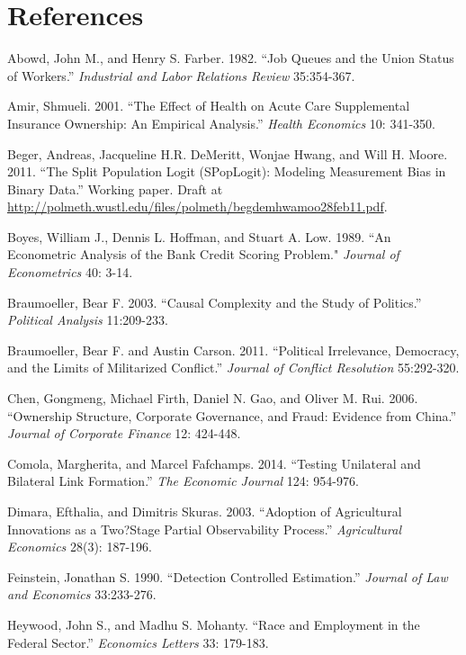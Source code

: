 \documentclass[10pt]{article}
\begin{document}
\singlespace

\section*{References}
\parskip=0.15in
\begin{hangparas}{.25in}{1}

Abowd, John M., and Henry S. Farber. 1982. ``Job Queues and the Union Status of Workers.'' \textit{Industrial and Labor Relations Review} 35:354-367.

Amir, Shmueli. 2001. ``The Effect of Health on Acute Care Supplemental Insurance Ownership: An Empirical Analysis.'' \textit{Health Economics} 10: 341-350.

Beger, Andreas, Jacqueline H.R. DeMeritt, Wonjae Hwang, and Will H. Moore. 2011. ``The Split Population Logit (SPopLogit): Modeling Measurement Bias in Binary Data.'' Working paper. Draft at \href{http://polmeth.wustl.edu/files/polmeth/begdemhwamoo28feb11.pdf}{http://polmeth.wustl.edu/files/polmeth/begdemhwamoo28feb11.pdf}.

Boyes, William J., Dennis L. Hoffman, and Stuart A. Low. 1989. ``An Econometric Analysis of the Bank Credit Scoring Problem." \textit{Journal of Econometrics} 40: 3-14.

Braumoeller, Bear F. 2003. ``Causal Complexity and the Study of Politics.'' \textit{Political Analysis} 11:209-233.

Braumoeller, Bear F. and Austin Carson. 2011. ``Political Irrelevance, Democracy, and the Limits of Militarized Conflict.'' \textit{Journal of Conflict Resolution} 55:292-320.

Chen, Gongmeng, Michael Firth, Daniel N. Gao, and Oliver M. Rui. 2006. ``Ownership Structure, Corporate Governance, and Fraud: Evidence from China.'' \textit{Journal of Corporate Finance} 12: 424-448.

Comola, Margherita, and Marcel Fafchamps. 2014. ``Testing Unilateral and Bilateral Link Formation.'' \textit{The Economic Journal} 124: 954-976. 

Dimara, Efthalia, and Dimitris Skuras. 2003. ``Adoption of Agricultural Innovations as a Two?Stage Partial Observability Process.'' \textit{Agricultural Economics} 28(3): 187-196.

Feinstein, Jonathan S. 1990. ``Detection Controlled Estimation.'' \textit{Journal of Law and Economics} 33:233-276.

Heywood, John S., and Madhu S. Mohanty. ``Race and Employment in the Federal Sector.'' \textit{Economics Letters} 33: 179-183.


\end{hangparas}
\end{document}
